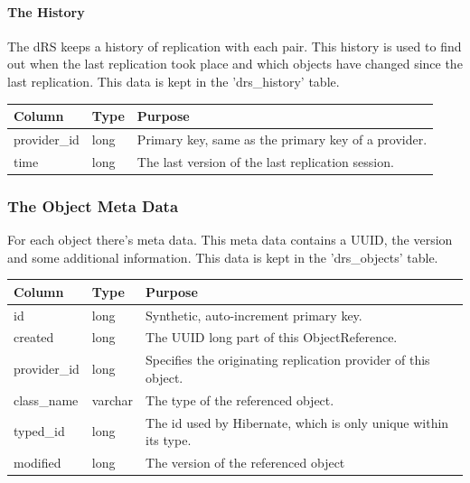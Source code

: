\paragraph*{The History}

The dRS keeps a history of replication with each pair. This history is used to find out when the last replication took place and which objects have changed since the last replication. This data is kept in the 'drs\_history' table.

{\small
\begin{longtable}{|p{}|p{}|p{}|}
\hline
\textbf{Column} & \textbf{Type} & \textbf{Purpose} \\ \hline
provider\_id & long & Primary key, same as the primary key of a provider. \\ \hline
time & long & The last version of the last replication session. \\ \hline
\end{longtable}}

\subsubsection*{The Object Meta Data}

For each object there's meta data. This meta data contains a UUID, the version and some additional information. This data is kept in the 'drs\_objects' table.

{\small
\begin{longtable}{|p{}|p{}|p{}|}
\hline
\textbf{Column} & \textbf{Type} & \textbf{Purpose} \\ \hline
id & long & Synthetic, auto-increment primary key. \\ \hline
created & long & The UUID long part of this ObjectReference. \\ \hline
provider\_id & long & Specifies the originating replication provider of this object. \\ \hline
class\_name & varchar & The type of the referenced object. \\ \hline
typed\_id & long & The id used by Hibernate, which is only unique within its type. \\ \hline
modified & long & The version of the referenced object \\ \hline
\end{longtable}}

